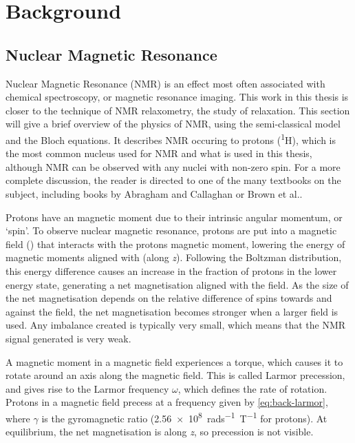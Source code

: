 \chapter{Background}\label{ch:background}

\section{Nuclear Magnetic Resonance}

Nuclear Magnetic Resonance (NMR) is an effect most often associated with chemical spectroscopy, or magnetic resonance imaging.
This work in this thesis is closer to the technique of NMR relaxometry, the study of relaxation.
This section will give a brief overview of the physics of NMR, using the semi-classical model and the Bloch equations.
It describes NMR occuring to protons (\textsuperscript{1}H), which is the most common nucleus used for NMR and what is used in this thesis, although NMR can be observed with any nuclei with non-zero spin.
For a more complete discussion, the reader is directed to one of the many textbooks on the subject, including books by Abragham\cite{AbragamPrinciplesNuclearMagnetism1961} and Callaghan\cite{CallaghanPrinciplesNuclearMagnetic1994} or Brown et al.\cite{BrownMagneticResonanceImaging2014a}.

Protons have an magnetic moment due to their intrinsic angular momentum, or `spin'.
To observe nuclear magnetic resonance, protons are put into a magnetic field (\Bzero) that interacts with the protons magnetic moment, lowering the energy of magnetic moments aligned with \Bzero (along \textit{z}).
Following the Boltzman distribution, this energy difference causes an increase in the fraction of protons in the lower energy state, generating a net magnetisation aligned with the \Bzero field.
As the size of the net magnetisation depends on the relative difference of spins towards and against the field, the net magnetisation becomes stronger when a larger \Bzero field is used.
Any imbalance created is typically very small, which means that the NMR signal generated is very weak.

A magnetic moment in a magnetic field experiences a torque, which causes it to rotate around an axis along the magnetic field.
This is called Larmor precession, and gives rise to the Larmor frequency $\omega$, which defines the rate of rotation.
Protons in a magnetic field precess at a frequency given by \autoref{eq:back-larmor}, where $\gamma$ is the gyromagnetic ratio (\SI{2.56e8}{rads^{-1}T^{-1}} for protons).
At equilibrium, the net magnetisation is along \textit{z}, so precession is not visible.

